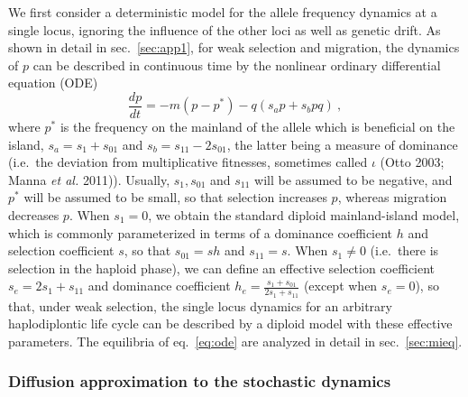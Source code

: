 \documentclass[
  11pt,
]{article}
\begin{document}
We first consider a deterministic model for the allele frequency
dynamics at a single locus, ignoring the influence of the other loci as
well as genetic drift. As shown in detail in sec.~\ref{sec:app1}, for
weak selection and migration, the dynamics of \(p\) can be described in
continuous time by the nonlinear ordinary differential equation (ODE)
\begin{equation}
   \frac{dp}{dt} = -m(p-p^\ast) -q(s_ap + s_bpq)\ ,
   \label{eq:ode}
\end{equation} where \(p^\ast\) is the frequency on the mainland of the
allele which is beneficial on the island, \(s_a = s_1 + s_{01}\) and
\(s_b = s_{11} - 2s_{01}\), the latter being a measure of dominance
(i.e.~the deviation from multiplicative fitnesses, sometimes called
\(\iota\) (Otto 2003; Manna \emph{et al.} 2011)). Usually,
\(s_1, s_{01}\) and \(s_{11}\) will be assumed to be negative, and
\(p^\ast\) will be assumed to be small, so that selection increases
\(p\), whereas migration decreases \(p\). When \(s_1 = 0\), we obtain
the standard diploid mainland-island model, which is commonly
parameterized in terms of a dominance coefficient \(h\) and selection
coefficient \(s\), so that \(s_{01} = sh\) and \(s_{11} = s\). When
\(s_1 \ne 0\) (i.e.~there is selection in the haploid phase), we can
define an effective selection coefficient \(s_e = 2s_1 + s_{11}\) and
dominance coefficient \(h_e = \frac{s_1 + s_{01}}{2s_1 + s_{11}}\)
(except when \(s_e = 0\)), so that, under weak selection, the single
locus dynamics for an arbitrary haplodiplontic life cycle can be
described by a diploid model with these effective parameters. The
equilibria of eq.~\ref{eq:ode} are analyzed in detail in
sec.~\ref{sec:mieq}.

\hypertarget{diffusion-approximation-to-the-stochastic-dynamics}{%
\subsubsection{Diffusion approximation to the stochastic
dynamics}\label{diffusion-approximation-to-the-stochastic-dynamics}}
\end{document}
